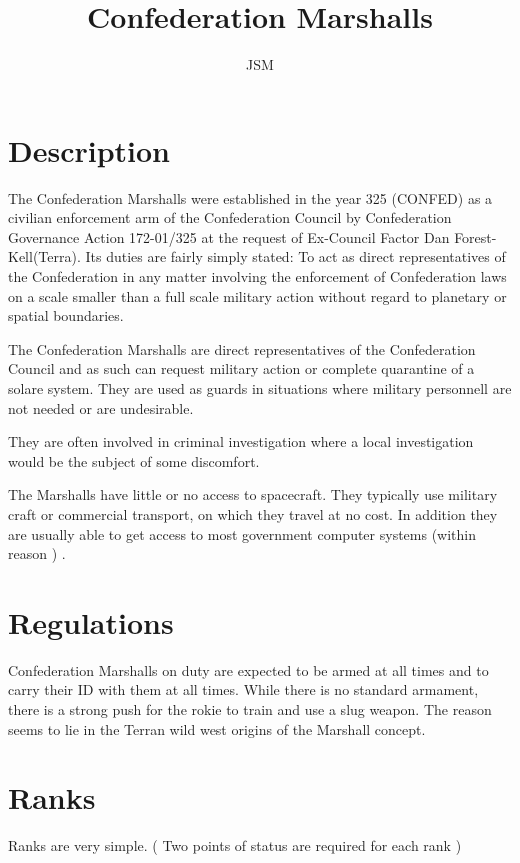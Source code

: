 \documentclass{article}
\begin{document}
\title{Confederation Marshalls}
\author{JSM}
\maketitle
\section{Description}

The Confederation Marshalls were established in the year 325 (CONFED) 
as a civilian enforcement arm of the Confederation Council by 
Confederation Governance Action 172-01/325 at the request of 
Ex-Council Factor Dan Forest-Kell(Terra). Its duties are fairly 
simply stated: To act as direct representatives of the Confederation 
in any matter involving the enforcement of Confederation laws on a
scale smaller than a full scale military action without regard to 
planetary or spatial boundaries.  

The Confederation Marshalls are direct representatives of the 
Confederation Council and as such can request military action or 
complete quarantine of a solare system. They are used as guards in 
situations where military personnell are not needed or are 
undesirable.

They are often involved in criminal investigation where a local 
investigation would be the subject of some discomfort.

The Marshalls have little or no access to spacecraft. They typically 
use military craft or commercial transport, on which they travel at 
no cost. In addition they are usually able to get access to most 
government computer systems (within reason ) .

\section{Regulations}

Confederation Marshalls on duty are expected to be armed at all times 
and to carry their ID with them at all times. While there is no 
standard armament, there is a strong push for the rokie to train and 
use a slug weapon. The reason seems to lie in the Terran wild west 
origins of the Marshall concept. 

\section{Ranks}

Ranks are very simple. ( Two points of status are required for each rank )
\end{document}
